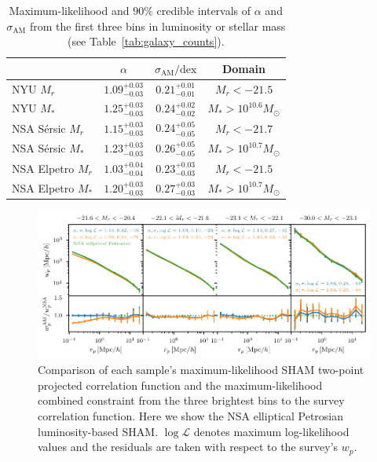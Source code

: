 \documentclass[usenatbib,useAMS]{mnras}
\newcommand{\scatter}{\ensuremath{\sigma_{\mathrm{AM}}}}
\begin{document}
\begin{table}
\renewcommand{\arraystretch}{1.25}
\begin{tabular}{lccc}
                        & $\alpha$               & $\scatter/\mathrm{dex}$               & Domain                  \\ \hline
\ac{NYU} $M_r$         & $1.09^{+0.03}_{-0.03}$ & $0.21^{+0.01}_{-0.01}$ & $M_r < - 21.5$           \\
\ac{NYU} $M_*$    & $1.25^{+0.03}_{-0.03}$ & $0.24^{+0.02}_{-0.02}$ & $M_* > 10^{10.6}M_\odot$        \\
\ac{NSA} S\'ersic $M_r$  & $1.15^{+0.03}_{-0.03}$ & $0.24^{+0.05}_{-0.05}$ & $M_r  < - 21.7$          \\
\ac{NSA} S\'ersic $M_*$ & $1.23^{+0.03}_{-0.03}$ & $0.26^{+0.05}_{-0.05}$ & $M_*> 10^{10.7}M_\odot$     \\
\ac{NSA} Elpetro $M_r$ & $1.03^{+0.04}_{-0.04}$ & $0.23^{+0.03}_{-0.03}$ & $M_r< -21.5$             \\
\ac{NSA} Elpetro $M_*$  & $1.20^{+0.03}_{-0.03}$ & $0.27^{+0.03}_{-0.03}$ & $M_* > 10^{10.7} M_\odot$  \\
\hline
\end{tabular}
\caption{\label{tab:combined_posteriors_results} Maximum-likelihood and $90\%$ credible intervals of $\alpha$ and $\scatter$ from the first three bins in luminosity or stellar mass (see Table~\ref{tab:galaxy_counts}).}
\end{table}


\begin{figure}
    \centering
    \includegraphics[width=1.0\textwidth]{Figures/NSA_elpetro_fits.pdf}
    \caption{Comparison of each sample's maximum-likelihood \ac{SHAM} two-point projected correlation function and the maximum-likelihood combined constraint from the three brightest bins to the survey correlation function. Here we show the \ac{NSA} elliptical Petrosian luminosity-based \ac{SHAM}. $\log\mathcal{L}$ denotes maximum log-likelihood values and the residuals are taken with respect to the survey's $w_p$.}
    \label{fig:fits_NSA_elpetro_LF}
\end{figure}
\end{document}

